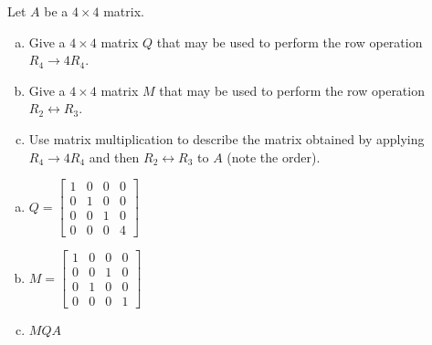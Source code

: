 
\begin{exerciseStatement}


Let \(A\) be a \(4 \times 4\) matrix.


\begin{enumerate}[(a)]
\item Give a \(4 \times 4\) matrix \(Q\) that may be used to perform the row operation \( R_4 \to 4R_4 \).
\item Give a \(4 \times 4\) matrix \(M\) that may be used to perform the row operation \( R_2 \leftrightarrow R_3 \).
\item Use matrix multiplication to describe the matrix obtained by applying \( R_4 \to 4R_4 \) and then \( R_2 \leftrightarrow R_3 \) to \(A\) (note the order). 
\end{enumerate}
    
\end{exerciseStatement}
    
\begin{exerciseAnswer} 

\begin{enumerate}[(a)]
\item \(Q= \left[\begin{array}{cccc}
1 & 0 & 0 & 0 \\
0 & 1 & 0 & 0 \\
0 & 0 & 1 & 0 \\
0 & 0 & 0 & 4
\end{array}\right] \)
\item \(M= \left[\begin{array}{cccc}
1 & 0 & 0 & 0 \\
0 & 0 & 1 & 0 \\
0 & 1 & 0 & 0 \\
0 & 0 & 0 & 1
\end{array}\right] \)
\item \(MQA\)
\end{enumerate}
    
\end{exerciseAnswer}
    
